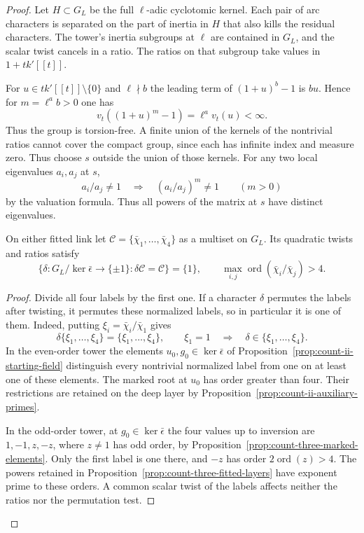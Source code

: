 \begin{proof}

Let \(H\subset G_L\) be the full \(\ell\)-adic cyclotomic
kernel. Each pair of arc characters is separated on the
part of inertia in \(H\) that also kills the residual
characters. The tower's inertia subgroups at \(\ell\)
are contained in \(G_L\), and the scalar twist cancels
in a ratio. The ratios on that subgroup take values in \(1+tk'[[t]]\).

For \(u\in tk'[[t]]\setminus\{0\}\) and \(\ell\nmid b\) the
leading term of \((1+u)^b-1\) is \(bu\). Hence for
\(m=\ell^a b>0\) one has
\[
            v_t((1+u)^m-1)=\ell^a v_t(u)<\infty .
\]
Thus the group is torsion-free. A finite union of the kernels of the nontrivial
ratios cannot cover the compact group, since each has
infinite index and measure zero. Thus choose \(s\) outside the union of those kernels.
For any two local eigenvalues \(a_i,a_j\) at \(s\),
\[
 a_i/a_j\ne1 \quad\Longrightarrow\quad
          (a_i/a_j)^m\ne1 \qquad(m>0)
\]
by the valuation formula. Thus all powers of the matrix
at \(s\) have distinct eigenvalues.

\begin{established}\label{hyp:ordinary-arc-residual-tests}
On either fitted link let \(\mathcal C=\{\bar\chi_1,\ldots,\bar\chi_4\}\)
as a multiset on \(G_L\). Its quadratic twists and ratios satisfy
\[
 \{\delta:G_L/\ker\bar\epsilon\to\{\pm1\}:\delta\mathcal C=\mathcal C\}
    =\{1\},\qquad
 \max_{i,j}\operatorname{ord}(\bar\chi_i/\bar\chi_j)>4 .
\]
\end{established}
\begin{proof}
Divide all four labels by the first one. If a character \(\delta\)
permutes the labels after twisting, it permutes these normalized
labels, so in particular it is one of them. Indeed, putting \(\xi_i=\bar\chi_i/\bar\chi_1\) gives
\[
          \delta\{\xi_1,\ldots,\xi_4\}=\{\xi_1,\ldots,\xi_4\},
       \qquad \xi_1=1 \quad\Longrightarrow\quad
          \delta\in\{\xi_1,\ldots,\xi_4\}.
\]
In the even-order tower
the elements \(u_0,g_0\in\ker\bar\epsilon\) of
Proposition~\ref{prop:count-ii-starting-field} distinguish every
nontrivial normalized label from one on at least one of these
elements. The marked root at \(u_0\) has order greater than four.
Their restrictions are retained on the deep layer by
Proposition~\ref{prop:count-ii-auxiliary-primes}.

In the odd-order tower, at \(g_0\in\ker\bar\epsilon\) the four
values up to inversion are \(1,-1,z,-z\), where \(z\ne1\) has
odd order, by Proposition~\ref{prop:count-three-marked-elements}.
Only the first label is one there, and \(-z\) has order
\(2\operatorname{ord}(z)>4\). The powers retained in
Proposition~\ref{prop:count-three-fitted-layers} have exponent
prime to these orders. A common scalar twist of the labels affects
neither the ratios nor the permutation test.
\end{proof}


\end{proof}
